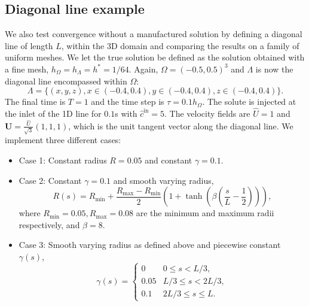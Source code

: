 \documentclass[pdflatex,sn-mathphys-num]{sn-jnl}%
\newcommand{\bfU}{{\boldsymbol U}}
\newcommand{\Bk}{\color{black}}
\newcommand{\Rd}{\color{red}}
\theoremstyle{thmstyleone}%
\theoremstyle{thmstyletwo}%
\theoremstyle{thmstylethree}%
\begin{document}
\subsection{Diagonal line example}
\label{sec:diagline}
We also test convergence without a manufactured solution by defining a diagonal line of length $L$, within the 3D domain and comparing the results on a family of uniform meshes. We let the true solution be defined as the solution obtained with a fine mesh, $h_\Omega = h_\Lambda = h^\ast = 1/64$.  Again, $\Omega = (-0.5,0.5)^3$ and $\Lambda$ is now the diagonal line encompassed within $\Omega$: 
\[
\Lambda = \{(x,y,z), x\in(-0.4,0.4), y\in(-0.4,0.4), z\in(-0.4,0.4)\}.
\]
The final time is $T=1$ and the time step is $\tau=0.1h_\Omega$. The solute is injected at the inlet of the 1D line for $0.1$s with $\hat{c}^{\mathrm{in}} = 5$.
The velocity fields are $\hat{U} = 1$ and $\bfU =\frac{\hat{U}}{\sqrt3}(1,1,1)$, which is the unit tangent vector along the diagonal line.   We implement three different cases:
\begin{itemize}
    \item Case 1: Constant radius $R= 0.05$ and constant $\gamma = 0.1$.
    \item Case 2: Constant $\gamma = 0.1$ and smooth varying radius, 
    \[R(s) = R_{\text{min}}+\frac{R_{\text{max}}-R_{\text{min}}}{2}\left(1+ \tanh\left(\beta\left(\frac{s}{L}-\frac{1}{2}\right)\right)\right),\]
    where $R_{\text{min}}=0.05, R_{\text{max}}=0.08$ are the minimum and maximum radii respectively, and $\beta=8$.
    \item Case 3: Smooth varying radius as defined above and piecewise constant $\gamma(s)$, 
    \[\gamma(s) = \begin{cases}
        0 & 0 \leq s < L/3, \\
        0.05 & L/3 \leq s <2L/3, \\
        0.1 & 2L/3 \leq s \leq L.
    \end{cases}\]
\end{itemize}
\end{document}
